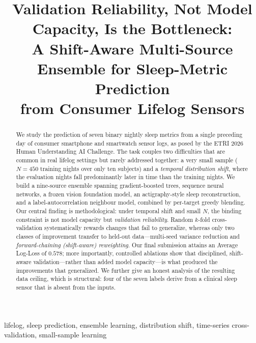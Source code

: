 \documentclass[conference]{IEEEtran}
\begin{document}
\title{Validation Reliability, Not Model Capacity, Is the Bottleneck:\\
A Shift-Aware Multi-Source Ensemble for Sleep-Metric Prediction\\
from Consumer Lifelog Sensors}

\author{
}

\maketitle

\begin{abstract}
We study the prediction of seven binary nightly sleep metrics from a single
preceding day of consumer smartphone and smartwatch sensor logs, as posed by the
ETRI 2026 Human Understanding AI Challenge. The task couples two difficulties that
are common in real lifelog settings but rarely addressed together: a very small
sample ($N{=}450$ training nights over only ten subjects) and a \emph{temporal
distribution shift}, where the evaluation nights fall predominantly later in time
than the training nights. We build a nine-source ensemble spanning gradient-boosted
trees, sequence neural networks, a frozen vision foundation model, an actigraphy-style
sleep reconstruction, and a label-autocorrelation neighbour model, combined by
per-target greedy blending. Our central finding is methodological: under temporal
shift and small $N$, the binding constraint is not model capacity but
\emph{validation reliability}. Random $k$-fold cross-validation systematically
rewards changes that fail to generalize, whereas only two classes of improvement
transfer to held-out data---multi-seed variance reduction and \emph{forward-chaining
(shift-aware) reweighting}. Our final submission attains an Average Log-Loss of $0.578$; more importantly,
controlled ablations show that disciplined, shift-aware validation---rather than added
model capacity---is what produced the improvements that generalized. We further give an
honest analysis of the resulting data ceiling, which is structural: four of the seven
labels derive from a clinical sleep sensor that is absent from the inputs.
\end{abstract}

\begin{IEEEkeywords}
lifelog, sleep prediction, ensemble learning, distribution shift, time-series
cross-validation, small-sample learning
\end{IEEEkeywords}
\end{document}
